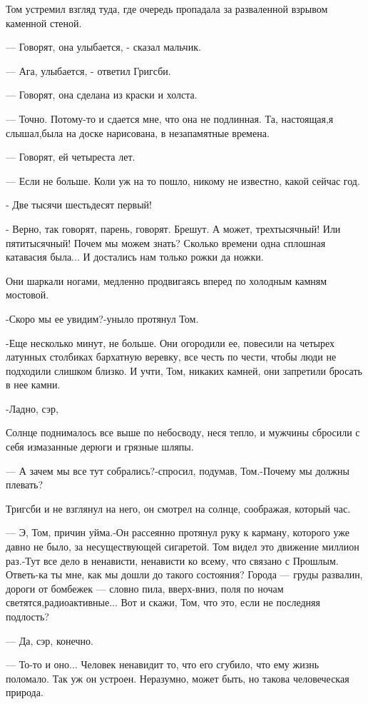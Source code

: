 Том устремил взгляд туда, где очередь пропадала за разваленной взрывом каменной
стеной.

— Говорят, она улыбается, - сказал мальчик.

— Ага, улыбается, - ответил Григсби.

— Говорят, она сделана из краски и холста.

— Точно. Потому-то и сдается мне, что она не подлинная. Та, настоящая,я
слышал,была на доске нарисована, в незапамятные времена.

— Говорят, ей четыреста лет.

— Если не больше. Коли уж на то пошло, никому не известно, какой сейчас год.

- Две тысячи шестьдесят первый!

- Верно, так говорят, парень, говорят. Брешут. А может, трехтысячный! Или
пятитысячный! Почем мы можем знать? Сколько времени одна сплошная катавасия
была... И достались нам только рожки да ножки.

Они шаркали ногами, медленно продвигаясь вперед по холодным камням мостовой.

-Скоро мы ее увидим?-уныло протянул Том.

-Еще несколько минут, не больше. Они огородили ее, повесили на четырех латунных
столбиках бархатную веревку, все честь по чести, чтобы люди не подходили
слишком близко. И учти, Том, никаких камней, они запретили бросать в нее камни.

-Ладно, сэр,

Солнце поднималось все выше по небосводу, неся тепло, и мужчины сбросили с себя
измазанные дерюги и грязные шляпы.

— А зачем мы все тут собрались?-спросил, подумав, Том.-Почему мы должны
плевать?

Тригсби и не взглянул на него, он смотрел на солнце, соображая, который час.

— Э, Том, причин уйма.-Он рассеянно протянул руку к карману, которого уже давно
не было, за несуществующей сигаретой. Том видел это движение миллион раз.-Тут
все дело в ненависти, ненависти ко всему, что связано с Прошлым. Ответь-ка ты
мне, как мы дошли до такого состояния? Города — груды развалин, дороги от
бомбежек — словно пила, вверх-вниз, поля по ночам светятся,радиоактивные... Вот и
скажи, Том, что это, если не последняя подлость?

— Да, сэр, конечно.

— То-то и оно... Человек ненавидит то, что его сгубило, что ему жизнь поломало.
Так уж он устроен. Неразумно, может быть, но такова человеческая природа.

